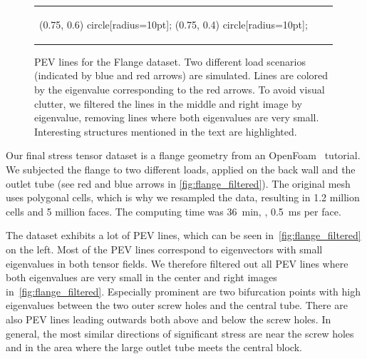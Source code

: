 \begin{figure}
\begin{tabular}{lcr}
{\begin{scope}[x={(img.south east)},y={(img.north west)}]
                 (0.75, 0.6) circle[radius=10pt];
                 (0.75, 0.4) circle[radius=10pt];
            \end{scope}
        }
    \end{tabular}
    \caption{\ac{PEV} lines for the Flange dataset. Two different load scenarios
             (indicated by blue and red arrows) are simulated. Lines are colored
             by the eigenvalue corresponding to the red arrows. To avoid visual
             clutter, we filtered the lines in the middle and right image by
             eigenvalue, removing lines where both eigenvalues are very small.
             Interesting structures mentioned in the text are highlighted.}
    \label{fig:flange_filtered}
\end{figure}
%
%
%
%
%
Our final stress tensor dataset is a flange geometry from an
OpenFoam~\cite{OpenFoamWWW} tutorial.
%
We subjected the flange to two different loads, applied on the back wall and the
outlet tube (see red and blue arrows in \autoref{fig:flange_filtered}).
%
The original mesh uses polygonal cells, which is why we resampled the data,
resulting in 1.2 million cells and 5 million faces.
%
The computing time was \SI{36}{\minute}, \ie, \SI{0.5}{\milli\second} per face.
%

%
The dataset exhibits a lot of \ac{PEV} lines, which can be seen
in~\autoref{fig:flange_filtered} on the left.
%
Most of the \ac{PEV} lines correspond to eigenvectors with small eigenvalues in both
tensor fields.
%
We therefore filtered out all \ac{PEV} lines where both eigenvalues are very small
in the center and right images in~\autoref{fig:flange_filtered}.
%
Especially prominent are two bifurcation points with high eigenvalues between
the two outer screw holes and the central tube.
%
There are also \ac{PEV} lines leading outwards both above and below the screw holes.
%
In general, the most similar directions of significant stress are near the
screw holes and in the area where the large outlet tube meets the central block.
%
%
%
